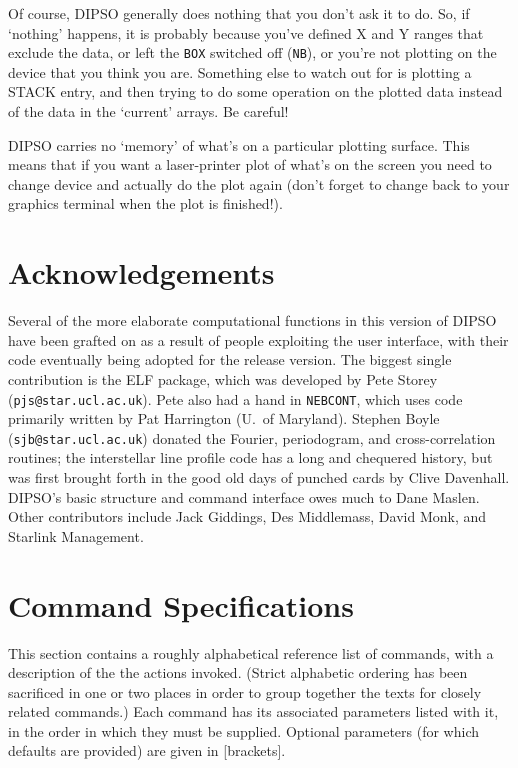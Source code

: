 \documentclass[twoside,11pt]{article}
\newcommand{\htmlref}[2]{#1}
\newcommand{\xlabel}[1]{}
\renewcommand{\_}{\texttt{\symbol{95}}}
\begin{document}
Of course, DIPSO generally does nothing that you don't ask it to do.
So, if `nothing' happens, it is probably because you've defined X and
Y ranges that exclude the data, or left the \htmlref{{\tt{BOX}}}{COM:BOX}  switched off
(\htmlref{{\tt{NB}}}{COM:NB}),  or you're not plotting on the device that you think you
are. Something else to watch out for is plotting a STACK entry, and
then trying to do some operation on the plotted data instead of the
data in the `current' arrays. Be careful!

DIPSO carries no `memory' of what's on a particular plotting surface.
This means that if you want a laser-printer plot of what's on the
screen you need to change device and actually do the plot again (don't
forget to change back to your graphics terminal when the plot is
finished!).

\section {Acknowledgements}

Several of the more elaborate computational functions in this version
of DIPSO have been grafted on as a result of people exploiting the user
interface, with their code eventually being adopted for the release
version. The biggest single contribution is the ELF package, which was
developed by Pete Storey ({\tt{pjs@star.ucl.ac.uk}}).  Pete also had a
hand in \htmlref{{\tt{NEBCONT}}}{COM:NEBCONT},  which uses code primarily written by Pat Harrington
(U.\ of Maryland). Stephen Boyle ({\tt{sjb@star.ucl.ac.uk}})  donated the
Fourier, periodogram, and cross-correlation routines; the interstellar
line profile code has a long and chequered history, but was first
brought forth in the good old days of punched cards by Clive
Davenhall. DIPSO's basic structure and command interface owes much to
Dane Maslen. Other contributors include Jack Giddings, Des Middlemass,
David Monk, and Starlink Management.

\newpage
\appendix

\section {\xlabel{HTXAPPFULL}\label{APP:FULL}Command Specifications}


This section contains a roughly alphabetical reference list of commands,
with a description of the the actions invoked.
(Strict alphabetic ordering has been sacrificed in one or two places in
order to group together the texts for closely related commands.) Each
command has its associated parameters listed with it, in the order in
which they must be supplied. Optional parameters (for which defaults are
provided) are given in [brackets].
\end{document}
